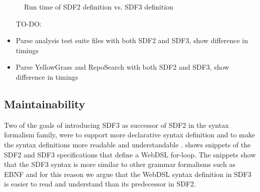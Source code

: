     \begin{figure}
      \caption{\label{fig:syntax-performance-charts}Run time of SDF2 definition vs. SDF3 definition}
    \end{figure}

    \begin{itemize}
      \item[TO-DO:]
      \item Parse analysis test suite files with both SDF2 and SDF3, show difference in timings
      \item Parse YellowGrass and RepoSearch with both SDF2 and SDF3, show difference in timings
    \end{itemize}

  \subsection{Maintainability}

    Two of the goals of introducing SDF3 as successor of SDF2 in the syntax formalism family, were to support more declarative syntax definition and to make the syntax definitions more readable and understandable \autocite{AmorimV20}.  shows snippets of the SDF2 and SDF3 specifications that define a WebDSL for-loop. The snippets show that the SDF3 syntax is more similar to other grammar formalisms such as EBNF \autocite{BackusBGK0NPRSV63} and for this reason we argue that the WebDSL syntax definition in SDF3 is easier to read and understand than its predecessor in SDF2.

